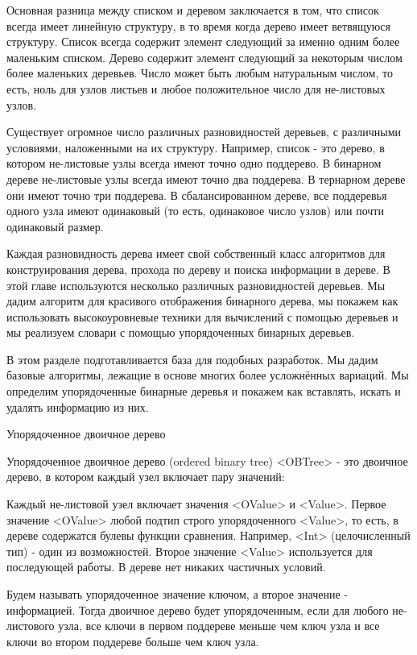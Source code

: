 Основная разница между списком и деревом заключается в том, что список всегда имеет линейную структуру, в то время когда дерево имеет ветвящуюся структуру. Список всегда содержит элемент следующий за именно одним более маленьким списком. Дерево содержит элемент следующий за некоторым числом более маленьких деревьев. Число может быть любым натуральным числом, то есть, ноль для узлов листьев и любое положительное число для не-листовых узлов.

Существует огромное число различных разновидностей деревьев, с различными условиями, наложенными на их структуру. Например, список - это дерево, в котором не-листовые узлы всегда имеют точно одно поддерево. В бинарном дереве не-листовые узлы всегда имеют точно два поддерева. В тернарном дереве они имеют точно три поддерева. В сбалансированном дереве, все поддеревья одного узла имеют одинаковый (то есть, одинаковое число узлов) или почти одинаковый размер.

Каждая разновидность дерева имеет свой собственный класс алгоритмов для конструирования дерева, прохода по дереву и поиска информации в дереве. В этой главе используются несколько различных разновидностей деревьев. Мы дадим алгоритм для красивого отображения бинарного дерева, мы покажем как использовать высокоуровневые техники для вычислений с помощью деревьев и мы реализуем словари с помощью упорядоченных бинарных деревьев.

В этом разделе подготавливается база для подобных разработок. Мы дадим базовые алгоритмы, лежащие в основе многих более усложнённых вариаций. Мы определим упорядоченные бинарные деревья и покажем как вставлять, искать и удалять информацию из них.

Упорядоченное двоичное дерево

Упорядоченное двоичное дерево (ordered binary tree) <OBTree> - это двоичное дерево, в котором каждый узел включает пару значений:

Каждый не-листовой узел включает значения <OValue> и <Value>. Первое значение <OValue> любой подтип строго упорядоченного <Value>, то есть, в дереве содержатся булевы функции сравнения. Например, <Int> (целочисленный тип) - один из возможностей. Второе значение <Value> используется для последующей работы. В дереве нет никаких частичных условий.

Будем называть упорядоченное значение ключом, а второе значение - информацией. Тогда двоичное дерево будет упорядоченным, если для любого не-листового узла, все ключи в первом поддереве меньше чем ключ узла и все ключи во втором поддереве больше чем ключ узла.

